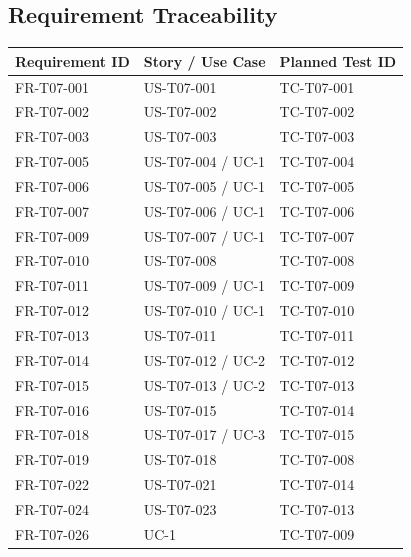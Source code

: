 \documentclass[11pt,a4paper]{article}
\newcommand{\rowstyle}{\rowcolor{headergray}}
\begin{document}
\subsection{Requirement Traceability}
\begin{longtable}{p{2.6cm} p{3.0cm} p{3.0cm}}
\toprule
\rowstyle \textbf{Requirement ID} & \textbf{Story / Use Case} & \textbf{Planned Test ID} \\
\midrule
\endhead
FR-T07-001 & US-T07-001 & TC-T07-001 \\
FR-T07-002 & US-T07-002 & TC-T07-002 \\
FR-T07-003 & US-T07-003 & TC-T07-003 \\
FR-T07-005 & US-T07-004 / UC-1 & TC-T07-004 \\
FR-T07-006 & US-T07-005 / UC-1 & TC-T07-005 \\
FR-T07-007 & US-T07-006 / UC-1 & TC-T07-006 \\
FR-T07-009 & US-T07-007 / UC-1 & TC-T07-007 \\
FR-T07-010 & US-T07-008 & TC-T07-008 \\
FR-T07-011 & US-T07-009 / UC-1 & TC-T07-009 \\
FR-T07-012 & US-T07-010 / UC-1 & TC-T07-010 \\
FR-T07-013 & US-T07-011 & TC-T07-011 \\
FR-T07-014 & US-T07-012 / UC-2 & TC-T07-012 \\
FR-T07-015 & US-T07-013 / UC-2 & TC-T07-013 \\
FR-T07-016 & US-T07-015 & TC-T07-014 \\
FR-T07-018 & US-T07-017 / UC-3 & TC-T07-015 \\
FR-T07-019 & US-T07-018 & TC-T07-008 \\
FR-T07-022 & US-T07-021 & TC-T07-014 \\
FR-T07-024 & US-T07-023 & TC-T07-013 \\
FR-T07-026 & UC-1 & TC-T07-009 \\
\bottomrule
\end{longtable}
\end{document}
